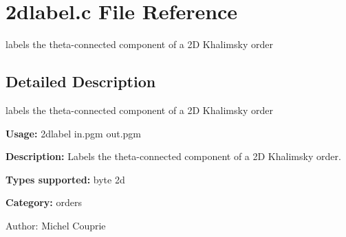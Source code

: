 \section{2dlabel.c File Reference}
\label{2dlabel_8c}
labels the theta-connected component of a 2D Khalimsky order  




\label{_details}
\subsection{Detailed Description}
labels the theta-connected component of a 2D Khalimsky order 

{\bf Usage:} 2dlabel in.pgm out.pgm

{\bf Description:} Labels the theta-connected component of a 2D Khalimsky order.

{\bf Types supported:} byte 2d

{\bf Category:} orders

\begin{Desc}
\item[Author:]Michel Couprie \end{Desc}
